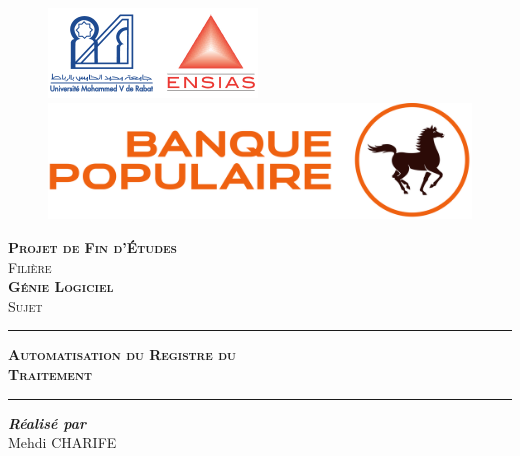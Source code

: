 \begin{titlepage}\label{TitlePäge}
\begin{center}
    \begin{figure}[!htb]
        \begin{minipage}{0.5\linewidth}
            \includegraphics[width=0.58\linewidth]{logos/Um5-ENSIAS.png}
        \end{minipage}
        \hspace{1.8cm}
        \begin{minipage}{0.5\linewidth}
            \includegraphics[width=0.84\linewidth]{logos/BCP.png}
        \end{minipage}
    \end{figure}
     
   \vspace*{1.6cm}

  \textsc{\huge \bfseries Projet de Fin d'Études}\\[1.3cm]
  \textsc{\small Filière}\\[1cm]
  \textsc{\huge \bfseries Génie Logiciel }\\[1.4cm]
  \textsc{\small Sujet}\\
  \begin{center}
 \rule{0.5\linewidth}{1pt}
 \end{center}
  \textsc{\huge \bfseries Automatisation du Registre du \\\vspace*{0.5cm} Traitement}
  \begin{center}
 \rule{0.5\linewidth}{1pt}
 \end{center}
 
 \vspace{2.8cm}
  
  \begin{minipage}{0.5\textwidth}
    \vspace{-6mm}
  \begin{flushleft}
    \emph{\bfseries Réalisé par}\\[0.2cm]
    Mehdi CHARIFE \\[0.5cm]
  

\end{flushleft}
\end{minipage}
\end{center}
\end{titlepage}
